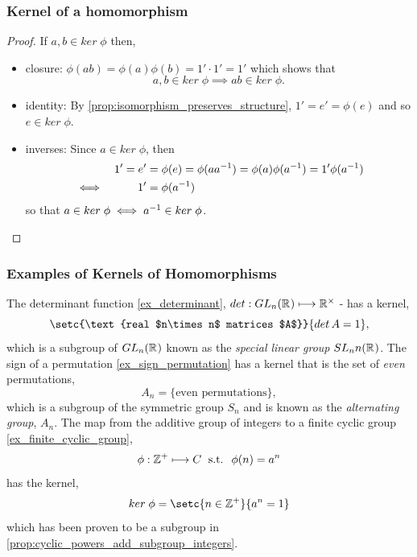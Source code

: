 \documentclass[MathsNotesBase.tex]{subfiles}
\begin{document}
{		\subsubsection{Kernel of a homomorphism}
	
		\begin{proof}
			If $a,b \in ker \; \phi$ then,
			\begin{itemize}
				\item{closure: $ \phi(ab) = \phi(a)\phi(b) = 1' \cdot 1' = 1' $ which shows that 
					\[ a,b \in ker \; \phi \implies ab \in ker \; \phi. \] }
				\item{identity: By \autoref{prop:isomorphism_preserves_structure}, $ 1' = e' = \phi(e) $ and so $e \in ker \; \phi $.}
				\item{inverses: Since $ a \in ker \; \phi $, then 
					\begin{align*}
					&&1' = e' &= \phi(e) = \phi(a{a}^{-1}) = \phi(a)\phi({a}^{-1}) = 1'\phi({a}^{-1}) \\
					&\iff &1' &= \phi({a}^{-1})
					\end{align*}
					so that $ a \in ker \; \phi \iff {a}^{-1} \in ker \; \phi $.}
			\end{itemize}
		\end{proof}
	
		\subsubsection{Examples of Kernels of Homomorphisms}
		\begin{exe}
			\ex The determinant function \ref{ex_determinant}, $ det : GL_n(\mathbb{R}^{}) \longmapsto \mathbb{R}^{\times} $ - has a kernel,
			\[ \setc{\text{real $n\times n$ matrices $A$}}{det \, A = 1}, \]
			which is a subgroup of $GL_n(\mathbb{R}^{})$ known as the \textit{special linear group} $SL_nn(\mathbb{R}^{})$.
			\label{ex_special_lin_group}
			\ex The sign of a permutation \ref{ex_sign_permutation} has a kernel that is the set of \textit{even} permutations,
			\[ A_n = \{\text{even permutations}\}, \]
			which is a subgroup of the symmetric group $S_n$ and is known as the \textit{alternating group}, $A_n$.
			\label{ex_alternating_group}
			\ex The map from the additive group of integers to a finite cyclic group \ref{ex_finite_cyclic_group},
			\[ \phi : \mathbb{Z}^{+} \longmapsto C \; \text{ s.t. } \; \phi(n) = a^n \]
			has the kernel,
			\[ ker \; \phi = \setc{n \in \Z{+}}{a^n = 1} \]
			which has been proven to be a subgroup in \autoref{prop:cyclic_powers_add_subgroup_integers}.
			\label{ex_kernel_cyclic_powers}
		\end{exe}
	}
\end{document}
